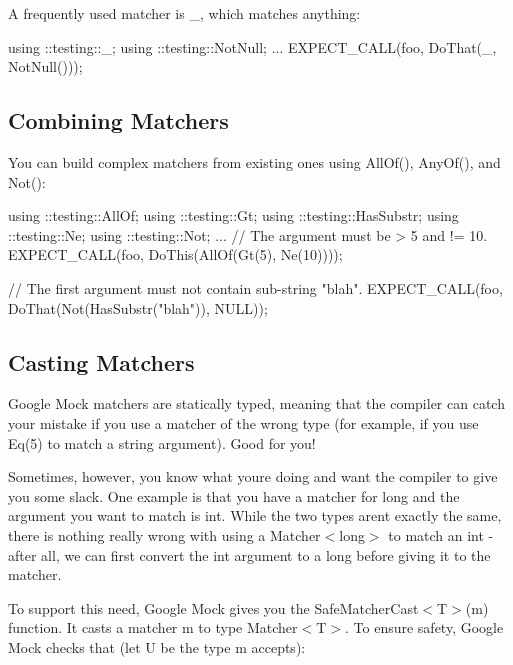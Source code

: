 A frequently used matcher is {\ttfamily \+\_\+}, which matches anything\+:


\begin{DoxyCode}
using ::testing::\_;
using ::testing::NotNull;
...
  EXPECT\_CALL(foo, DoThat(\_, NotNull()));
\end{DoxyCode}


\subsection*{Combining Matchers}

You can build complex matchers from existing ones using {\ttfamily All\+Of()}, {\ttfamily Any\+Of()}, and {\ttfamily Not()}\+:


\begin{DoxyCode}
using ::testing::AllOf;
using ::testing::Gt;
using ::testing::HasSubstr;
using ::testing::Ne;
using ::testing::Not;
...
  \textcolor{comment}{// The argument must be > 5 and != 10.}
  EXPECT\_CALL(foo, DoThis(AllOf(Gt(5),
                                Ne(10))));

  \textcolor{comment}{// The first argument must not contain sub-string "blah".}
  EXPECT\_CALL(foo, DoThat(Not(HasSubstr(\textcolor{stringliteral}{"blah"})),
                          NULL));
\end{DoxyCode}


\subsection*{Casting Matchers}

Google Mock matchers are statically typed, meaning that the compiler can catch your mistake if you use a matcher of the wrong type (for example, if you use {\ttfamily Eq(5)} to match a {\ttfamily string} argument). Good for you!

Sometimes, however, you know what you\textquotesingle{}re doing and want the compiler to give you some slack. One example is that you have a matcher for {\ttfamily long} and the argument you want to match is {\ttfamily int}. While the two types aren\textquotesingle{}t exactly the same, there is nothing really wrong with using a {\ttfamily Matcher$<$long$>$} to match an {\ttfamily int} -\/ after all, we can first convert the {\ttfamily int} argument to a {\ttfamily long} before giving it to the matcher.

To support this need, Google Mock gives you the {\ttfamily Safe\+Matcher\+Cast$<$T$>$(m)} function. It casts a matcher {\ttfamily m} to type {\ttfamily Matcher$<$T$>$}. To ensure safety, Google Mock checks that (let {\ttfamily U} be the type {\ttfamily m} accepts)\+:


